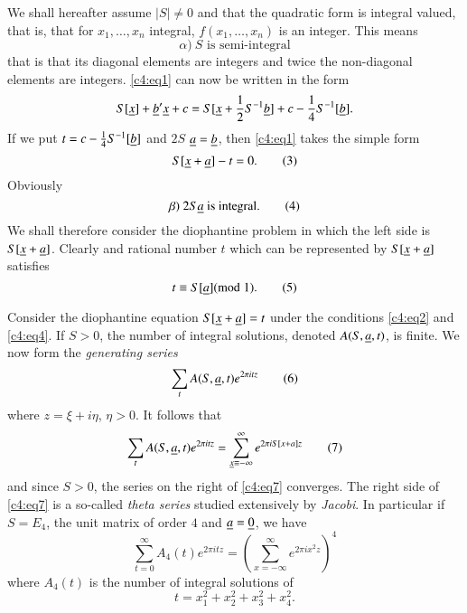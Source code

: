 We shall hereafter assume $|S|\neq 0$ and that the quadratic form is
integral valued, that is, that for $x_{1},\ldots,x_{n}$ integral,
$f(x_{1},\ldots,x_{n})$ is an integer. This means
\begin{equation*}
\alpha)~S\text{ is semi-integral}\tag{2}\label{c4:eq2}
\end{equation*}
that is that its diagonal elements are integers and twice the
non-diagonal elements are integers. \eqref{c4:eq1} can now be written in
the form
$$
S[\underline{x}]+\underline{b}'\underline{x}+c=S[\underline{x}+\frac{1}{2}S^{-1}\underline{b}]+c-\frac{1}{4}S^{-1}[\underline{b}]. 
$$
If we put $t=c-\frac{1}{4}S^{-1}[\underline{b}]$ and $2S$ $\underline{a}=\underline{b}$,
then \eqref{c4:eq1} takes the simple form
\begin{equation*}
S[\underline{x}+\underline{a}]-t=0.\tag{3}\label{c4:eq3}
\end{equation*}\pageoriginale
Obviously
\begin{equation*}
\beta)~2S\underline{a} \text{ is integral.}\tag{4}\label{c4:eq4}
\end{equation*}
We shall therefore consider the diophantine problem in which the left
side is $S[\underline{x}+\underline{a}]$. Clearly and rational number $t$ which can
be represented by $S[\underline{x}+\underline{a}]$ satisfies
\begin{equation*}
t\equiv S[\underline{a}] (\rm{mod} \; 1).\tag{5}\label{c4:eq5}
\end{equation*}

Consider the diophantine equation $S[\underline{x}+\underline{a}]=t$ under the
conditions \eqref{c4:eq2} and \eqref{c4:eq4}. If $S>0$, the number of integral
solutions, denoted $A(S,\underline{a},t)$, is finite. We now form the {\em
  generating series}
\begin{equation*}
\sum_{t}A(S,\underline{a},t)e^{2\pi itz}\tag{6}\label{c4:eq6}
\end{equation*}
where $z=\xi+i\eta$, $\eta>0$. It follows that
\begin{equation*}
\sum_{t}A(S,\underline{a},t)e^{2\pi itz}=\sum^{\infty}_{\underline{x}\equiv
  -\infty} e^{2\pi iS[x+a] z} \tag{7}\label{c4:eq7}
\end{equation*}
and since $S>0$, the series on the right of \eqref{c4:eq7} converges. The
right side of \eqref{c4:eq7} is a so-called {\em theta series} studied
extensively by {\em Jacobi}. In particular if $S=E_{4}$, the unit
matrix of order $4$ and $\underline{a}=\underline{0}$, we have
$$
\sum^{\infty}_{t=0}A_{4}(t)e^{2\pi
  itz}=\left(\sum^{\infty}_{x=-\infty}e^{2\pi ix^{2}z}\right)^{4}
$$
where $A_{4}(t)$ is the number of integral solutions of
\begin{equation*}
t=x^{2}_{1}+x^{2}_{2}+x^{2}_{3}+x^{2}_{4}.\tag{8}\label{c4:eq8}
\end{equation*}

